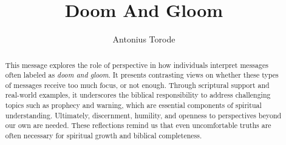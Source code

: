 \documentclass[10pt]{article}
\title{Doom And Gloom}
\author{Antonius Torode}
\begin{document}
\maketitle
\thispagestyle{fancy}

\begin{abstract}
	This message explores the role of perspective in how individuals interpret messages often labeled as \textit{doom and gloom}. It presents contrasting views on whether these types of  messages receive too much focus, or not enough. Through scriptural support and real-world examples, it underscores the biblical responsibility to address challenging topics such as prophecy and warning, which are essential components of spiritual understanding. Ultimately, discernment, humility, and openness to perspectives beyond our own are needed. These reflections remind us that even uncomfortable truths are often necessary for spiritual growth and biblical completeness.
\end{abstract}
\end{document}
